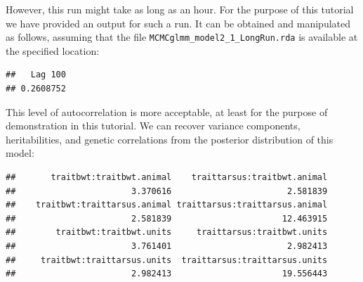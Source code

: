 \documentclass[
  12pt,
]{book}
\newenvironment{Shaded}{\begin{snugshade}}{\end{snugshade}}
\newcommand{\AttributeTok}[1]{\textcolor[rgb]{0.77,0.63,0.00}{#1}}
\newcommand{\DecValTok}[1]{\textcolor[rgb]{0.00,0.00,0.81}{#1}}
\newcommand{\FloatTok}[1]{\textcolor[rgb]{0.00,0.00,0.81}{#1}}
\newcommand{\FunctionTok}[1]{\textcolor[rgb]{0.00,0.00,0.00}{#1}}
\newcommand{\NormalTok}[1]{#1}
\newcommand{\OtherTok}[1]{\textcolor[rgb]{0.56,0.35,0.01}{#1}}
\newcommand{\SpecialCharTok}[1]{\textcolor[rgb]{0.00,0.00,0.00}{#1}}
\newcommand{\StringTok}[1]{\textcolor[rgb]{0.31,0.60,0.02}{#1}}
\begin{document}
However, this run might take as long as an hour. For the purpose of this tutorial we have provided an output for such a run. It can be obtained and manipulated as follows, assuming that the file \texttt{MCMCglmm\_model2\_1\_LongRun.rda} is available at the specified location:

\begin{Shaded}
\end{Shaded}

\begin{verbatim}
##   Lag 100 
## 0.2608752
\end{verbatim}

This level of autocorrelation is more acceptable, at least for the purpose of demonstration in this tutorial.
We can recover variance components, heritabilities, and genetic correlations from the posterior distribution of this model:

\begin{Shaded}
\end{Shaded}

\begin{verbatim}
##       traitbwt:traitbwt.animal    traittarsus:traitbwt.animal 
##                       3.370616                       2.581839 
##    traitbwt:traittarsus.animal traittarsus:traittarsus.animal 
##                       2.581839                      12.463915 
##        traitbwt:traitbwt.units     traittarsus:traitbwt.units 
##                       3.761401                       2.982413 
##     traitbwt:traittarsus.units  traittarsus:traittarsus.units 
##                       2.982413                      19.556443
\end{verbatim}

\begin{Shaded}
\end{Shaded}
\end{document}
